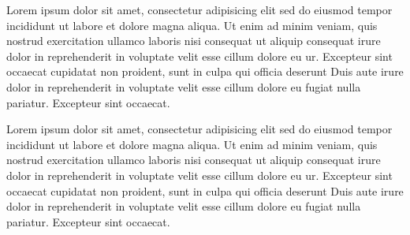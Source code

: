 \documentclass[a4paper, oneside, notitlepage, 12pt]{article}
\title{}
\date{}
\author{}
\begin{document}
\makeatletter

\begin{pages}

\begin{Leftside}
\beginnumbering
\pstart
Lorem ipsum dolor sit amet, consectetur adipisicing elit
sed do eiusmod tempor incididunt ut labore et dolore
magna aliqua. Ut enim ad minim veniam, quis nostrud
exercitation ullamco laboris nisi
 consequat ut aliquip consequat\pend[\vskip 2ex]
\pstart
{} irure dolor in reprehenderit
in voluptate velit esse cillum dolore eu ur. Excepteur sint occaecat
cupidatat non proident, sunt in culpa qui officia deserunt
Duis aute irure dolor in reprehenderit
in voluptate velit esse cillum dolore eu fugiat nulla
pariatur. Excepteur sint occaecat.
\pend
\endnumbering
\end{Leftside}

\begin{Rightside}

\beginnumbering
\pstart
Lorem ipsum dolor sit amet, consectetur adipisicing elit
sed do eiusmod tempor incididunt ut labore et dolore
magna aliqua. Ut enim ad minim veniam, quis nostrud
exercitation ullamco laboris nisi
 consequat ut aliquip consequat\pend[\vskip 2ex]
\pstart
{} irure dolor in reprehenderit
in voluptate velit esse cillum dolore eu ur. Excepteur sint occaecat
cupidatat non proident, sunt in culpa qui officia deserunt
Duis aute irure dolor in reprehenderit
in voluptate velit esse cillum dolore eu fugiat nulla
pariatur. Excepteur sint occaecat.
\pend
\endnumbering
\end{Rightside}


\Pages
\end{pages}
\end{document}
